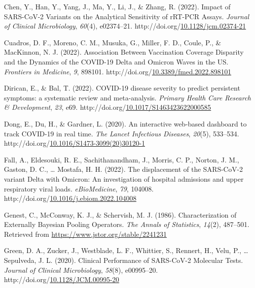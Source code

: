 \documentclass[12pt,twoside]{smiththesis}
\newlength{\cslhangindent}
\newenvironment{CSLReferences}[2] %
 {%
\setlength{\parindent}{0pt}
\ifodd #1 \everypar{\setlength{\hangindent}{\cslhangindent}}\ignorespaces\fi
\ifnum #2 > 0
\setlength{\parskip}{#2\baselineskip}
  \fi
}%
{}
\begin{document}
\begin{CSLReferences}{1}{0}
\leavevmode{}%
Chen, Y., Han, Y., Yang, J., Ma, Y., Li, J., \& Zhang, R. (2022). Impact of SARS-CoV-2 Variants on the Analytical Sensitivity of rRT-PCR Assays. \emph{Journal of Clinical Microbiology}, \emph{60}(4), e02374--21. http://doi.org/\href{https://doi.org/10.1128/jcm.02374-21}{10.1128/jcm.02374-21}

\leavevmode{}%
Cuadros, D. F., Moreno, C. M., Musuka, G., Miller, F. D., Coule, P., \& MacKinnon, N. J. (2022). Association Between Vaccination Coverage Disparity and the Dynamics of the COVID-19 Delta and Omicron Waves in the US. \emph{Frontiers in Medicine}, \emph{9}, 898101. http://doi.org/\href{https://doi.org/10.3389/fmed.2022.898101}{10.3389/fmed.2022.898101}

\leavevmode{}%
Dirican, E., \& Bal, T. (2022). COVID-19 disease severity to predict persistent symptoms: a systematic review and meta-analysis. \emph{Primary Health Care Research \& Development}, \emph{23}, e69. http://doi.org/\href{https://doi.org/10.1017/S1463423622000585}{10.1017/S1463423622000585}

\leavevmode{}%
Dong, E., Du, H., \& Gardner, L. (2020). An interactive web-based dashboard to track COVID-19 in real time. \emph{The Lancet Infectious Diseases}, \emph{20}(5), 533--534. http://doi.org/\href{https://doi.org/10.1016/S1473-3099(20)30120-1}{10.1016/S1473-3099(20)30120-1}

\leavevmode{}%
Fall, A., Eldesouki, R. E., Sachithanandham, J., Morris, C. P., Norton, J. M., Gaston, D. C., \ldots{} Mostafa, H. H. (2022). The displacement of the SARS-CoV-2 variant Delta with Omicron: An investigation of hospital admissions and upper respiratory viral loads. \emph{eBioMedicine}, \emph{79}, 104008. http://doi.org/\href{https://doi.org/10.1016/j.ebiom.2022.104008}{10.1016/j.ebiom.2022.104008}

\leavevmode{}%
Genest, C., McConway, K. J., \& Schervish, M. J. (1986). Characterization of Externally Bayesian Pooling Operators. \emph{The Annals of Statistics}, \emph{14}(2), 487--501. Retrieved from \url{https://www.jstor.org/stable/2241231}

\leavevmode{}%
Green, D. A., Zucker, J., Westblade, L. F., Whittier, S., Rennert, H., Velu, P., \ldots{} Sepulveda, J. L. (2020). Clinical Performance of SARS-CoV-2 Molecular Tests. \emph{Journal of Clinical Microbiology}, \emph{58}(8), e00995--20. http://doi.org/\href{https://doi.org/10.1128/JCM.00995-20}{10.1128/JCM.00995-20}


\end{CSLReferences}
\end{document}
